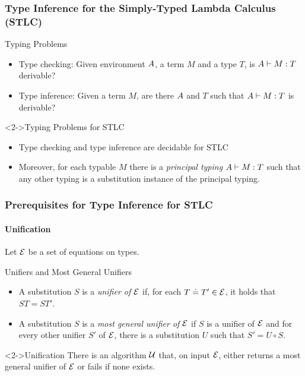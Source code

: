 \documentclass[pdftex,aspectratio=169]{beamer}
\begin{document}
\begin{frame}
  \frametitle{Type Inference for the Simply-Typed Lambda Calculus (STLC)}
  \begin{block}{Typing Problems}
    \begin{itemize}
    \item Type checking: Given environment $A$, a term $M$ and a
      type $T$, is $A \vdash M : T$ derivable?
    \item Type inference: Given a term $M$, are there $A$ and $T$ such
      that $A\vdash M : T$ is derivable?
    \end{itemize}
  \end{block}
  \begin{block}<2->{Typing Problems for STLC}
    \begin{itemize}
    \item Type checking and type inference are decidable for STLC
    \item Moreover, for each typable $M$ there is a \emph{principal typing}
      $A\vdash M:T$ such that any other typing is a
      substitution instance of the principal typing.
    \end{itemize}
  \end{block}
\end{frame}


\begin{frame}
  \frametitle{Prerequisites for Type Inference for STLC}
  \framesubtitle{Unification}
  Let $\mathcal{E}$ be a set of equations on types.
  \begin{block}{Unifiers and Most General Unifiers}
    \begin{itemize}
    \item A substitution $S$ is a \emph{unifier of $\mathcal{E}$} if,
      for each $T \doteq T'\in \mathcal{E}$, it holds that $ST
      = ST'$.
    \item 
      A substitution $S$ is a \emph{most general unifier of
        $\mathcal{E}$} if $S$ is a unifier of $\mathcal{E}$ and for every
      other unifier $S'$ of $\mathcal{E}$, there is a substitution
      $U$ such that $S' = U \circ S$.
    \end{itemize}
  \end{block}
  \begin{block}<2->{Unification}
    There is an algorithm $\mathcal{U}$ that, on input $\mathcal{E}$, either returns a
    most general unifier of $\mathcal{E}$ or fails if none exists.
  \end{block}
\end{frame}
\end{document}
